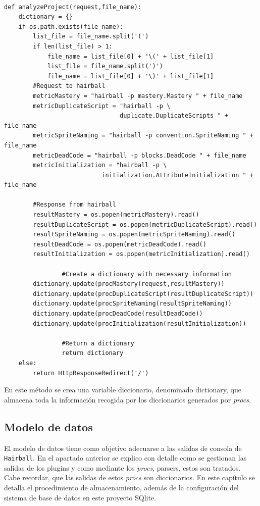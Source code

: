 \documentclass[a4paper, 12pt]{book}
\begin{document}
\begingroup
\fontsize{7pt}{8pt}\selectfont
\begin{verbatim}

def analyzeProject(request,file_name):
    dictionary = {}
    if os.path.exists(file_name):
        list_file = file_name.split('(')
        if len(list_file) > 1:
            file_name = list_file[0] + '\(' + list_file[1]
            list_file = file_name.split(')')
            file_name = list_file[0] + '\)' + list_file[1]
        #Request to hairball
        metricMastery = "hairball -p mastery.Mastery " + file_name
        metricDuplicateScript = "hairball -p \
                                duplicate.DuplicateScripts " + file_name
        metricSpriteNaming = "hairball -p convention.SpriteNaming " + file_name
        metricDeadCode = "hairball -p blocks.DeadCode " + file_name 
        metricInitialization = "hairball -p \
                           initialization.AttributeInitialization " + file_name

        #Response from hairball
        resultMastery = os.popen(metricMastery).read()
        resultDuplicateScript = os.popen(metricDuplicateScript).read()
        resultSpriteNaming = os.popen(metricSpriteNaming).read()
        resultDeadCode = os.popen(metricDeadCode).read()
        resultInitialization = os.popen(metricInitialization).read()
        
				#Create a dictionary with necessary information
        dictionary.update(procMastery(request,resultMastery))
        dictionary.update(procDuplicateScript(resultDuplicateScript))
        dictionary.update(procSpriteNaming(resultSpriteNaming))
        dictionary.update(procDeadCode(resultDeadCode))
        dictionary.update(procInitialization(resultInitialization))
        
				#Return a dictionary
				return dictionary
    else:
        return HttpResponseRedirect('/')

\end{verbatim}
\endgroup

En este método se crea una variable diccionario, denominado dictionary, que almacena
toda la información recogida por los diccionarios generados por \emph{procs}. 


\subsection{Modelo de datos}
El modelo de datos tiene como objetivo adecuarse a las salidas de consola de \texttt{Hairball}.
En el apartado anterior se explico con detalle como se gestionan las salidas de los
plugins y como mediante los \emph{procs}, parsers, estos son tratados. Cabe recordar,
que las salidas de estos \emph{procs} son diccionarios. En este capítulo se detalla
el procedimiento de almacenamiento, además de la configuración del sistema de base
de datos en este proyecto SQlite. \\
\end{document}
